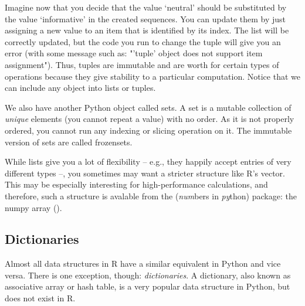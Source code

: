 
Imagine now that you decide that the value `neutral' should be
substituted by the value `informative' in the created sequences. You
can update them by just assigning a new value to an item that is
identified by its index.  The list will be correctly updated, but the
code you run to change the tuple will give you an error (with some
message such as: "'tuple' object does not support item
assignment"). Thus, tuples are immutable and are worth for certain
types of operations because they give stability to a particular
computation. Notice that we can include any object into lists or
tuples.






We also have another Python object called sets. A set is a mutable
collection of \emph{unique} elements (you cannot repeat a value) with
no order. As it is not properly ordered, you cannot run any indexing
or slicing operation on it. The immutable version of sets are called
frozensets.



While lists give you a lot of flexibility -- e.g., they happily accept
entries of very different types --, you sometimes may want a stricter
structure like R's vector. This may be especially interesting for
high-performance calculations, and therefore, such a structure is
avalable from the  (\emph{num}bers in \emph{py}thon)
package: the numpy array ().




\subsection{Dictionaries}
Almost all data structures in R have a similar equivalent in Python
and vice versa. There is one exception, though: \emph{dictionaries}. A
dictionary, also known as associative array or hash table, is a very
popular data structure in Python, but does not exist in R.

